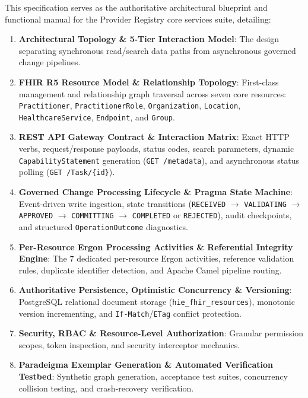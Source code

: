 This specification serves as the authoritative architectural blueprint and functional manual for the Provider Registry core services suite, detailing:
\begin{enumerate}
    \item \textbf{Architectural Topology \& 5-Tier Interaction Model}: The design separating synchronous read/search data paths from asynchronous governed change pipelines.
    \item \textbf{FHIR R5 Resource Model \& Relationship Topology}: First-class management and relationship graph traversal across seven core resources: \texttt{Practitioner}, \texttt{PractitionerRole}, \texttt{Organization}, \texttt{Location}, \texttt{HealthcareService}, \texttt{Endpoint}, and \texttt{Group}.
    \item \textbf{REST API Gateway Contract \& Interaction Matrix}: Exact HTTP verbs, request/response payloads, status codes, search parameters, dynamic \texttt{CapabilityStatement} generation (\texttt{GET /metadata}), and asynchronous status polling (\texttt{GET /Task/\{id\}}).
    \item \textbf{Governed Change Processing Lifecycle \& Pragma State Machine}: Event-driven write ingestion, state transitions (\texttt{RECEIVED} $\rightarrow$ \texttt{VALIDATING} $\rightarrow$ \texttt{APPROVED} $\rightarrow$ \texttt{COMMITTING} $\rightarrow$ \texttt{COMPLETED} or \texttt{REJECTED}), audit checkpoints, and structured \texttt{OperationOutcome} diagnostics.
    \item \textbf{Per-Resource Ergon Processing Activities \& Referential Integrity Engine}: The 7 dedicated per-resource Ergon activities, reference validation rules, duplicate identifier detection, and Apache Camel pipeline routing.
    \item \textbf{Authoritative Persistence, Optimistic Concurrency \& Versioning}: PostgreSQL relational document storage (\texttt{hie\_fhir\_resources}), monotonic version incrementing, and \texttt{If-Match}/\texttt{ETag} conflict protection.
    \item \textbf{Security, RBAC \& Resource-Level Authorization}: Granular permission scopes, token inspection, and security interceptor mechanics.
    \item \textbf{Paradeigma Exemplar Generation \& Automated Verification Testbed}: Synthetic graph generation, acceptance test suites, concurrency collision testing, and crash-recovery verification.
\end{enumerate}

